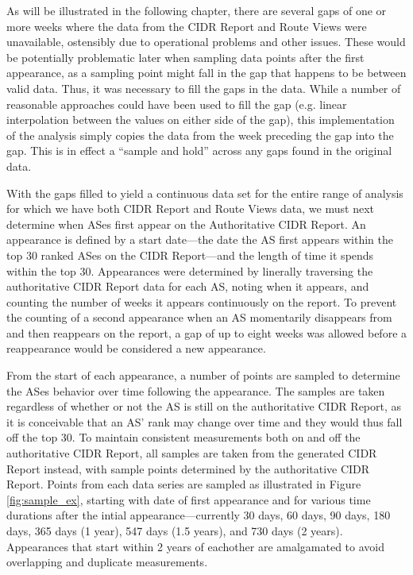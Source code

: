 As will be illustrated in the following chapter, there are several gaps of one
or more weeks where the data from the CIDR Report and Route Views were
unavailable, ostensibly due to operational problems and other issues. These
would be potentially problematic later when sampling data points after the
first appearance, as a sampling point might fall in the gap that happens to be
between valid data. Thus, it was necessary to fill the gaps in the data. While
a number of reasonable approaches could have been used to fill the gap (e.g.
linear interpolation between the values on either side of the gap), this
implementation of the analysis simply copies the data from the week preceding
the gap into the gap. This is in effect a ``sample and hold'' across any gaps
found in the original data.

With the gaps filled to yield a continuous data set for the entire range of
analysis for which we have both CIDR Report and Route Views data, we must next
determine when ASes first appear on the Authoritative CIDR Report. An
appearance is defined by a start date---the date the AS first appears within
the top 30 ranked ASes on the CIDR Report---and the length of time it spends
within the top 30. Appearances were determined by linerally traversing the
authoritative CIDR Report data for each AS, noting when it appears, and
counting the number of weeks it appears continuously on the report. To prevent
the counting of a second appearance when an AS momentarily disappears from and
then reappears on the report, a gap of up to eight weeks was allowed before a
reappearance would be considered a new appearance.

From the start of each appearance, a number of points are sampled to determine
the ASes behavior over time following the appearance. The samples are taken
regardless of whether or not the AS is still on the authoritative CIDR Report,
as it is conceivable that an AS' rank may change over time and they would thus
fall off the top 30. To maintain consistent measurements both on and off the
authoritative CIDR Report, all samples are taken from the generated CIDR Report
instead, with sample points determined by the authoritative CIDR Report. Points
from each data series are sampled as illustrated in Figure \ref{fig:sample_ex},
starting with date of first appearance and for various time durations after the
intial appearance---currently 30 days, 60 days, 90 days, 180 days, 365 days (1
year), 547 days (1.5 years), and 730 days (2 years). Appearances that start
within 2 years of eachother are amalgamated to avoid overlapping and duplicate
measurements.

